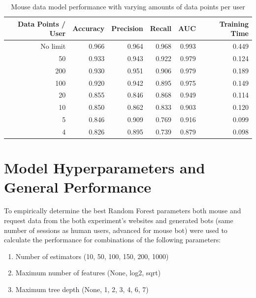 \documentclass[
    fontsize=12pt,
    headings=small,
    parskip=half,           %
    bibliography=totoc,
    numbers=noenddot,       %
    open=any,               %
    final,                   %
    table
]{scrreprt}
\begin{document}
\begin{table}[H]
    \begin{center}
        \begin{tabular}{rrrrrr}
            \toprule
            Data Points / User & Accuracy & Precision & Recall & AUC & Training Time \\
            \midrule
            No limit & 0.966 & 0.964 & 0.968 & 0.993 & 0.449 \\
            50 & 0.933 & 0.943 & 0.922 & 0.979 & 0.124 \\
            200 & 0.930 & 0.951 & 0.906 & 0.979 & 0.189 \\
            100 & 0.920 & 0.942 & 0.895 & 0.975 & 0.149 \\
            20 & 0.855 & 0.846 & 0.868 & 0.949 & 0.114 \\
            10 & 0.850 & 0.862 & 0.833 & 0.903 & 0.120 \\
            5 & 0.846 & 0.909 & 0.769 & 0.916 & 0.099 \\
            4 & 0.826 & 0.895 & 0.739 & 0.879 & 0.098 \\
            \bottomrule
        \end{tabular}
    \end{center}
    \caption{Mouse data model performance with varying amounts of data points per user}
    \label{table:mouse_params_no_limit}
\end{table}


\section{Model Hyperparameters and General Performance}

To empirically determine the best Random Forest parameters both mouse and request data from the both experiment's websites and generated bots (same number of sessions as human users, advanced for mouse bot) were used to calculate the performance for combinations of the following parameters:

\begin{enumerate}
    \item Number of estimators (10, 50, 100, 150, 200, 1000)
    \item Maximum number of features (None, log2, sqrt)
    \item Maximum tree depth (None, 1, 2, 3, 4, 6, 7)
\end{enumerate}
\end{document}

